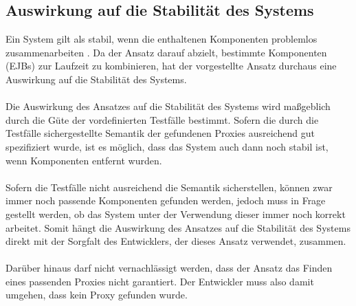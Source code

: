 \subsection{Auswirkung auf die Stabilität des Systems}\label{sec_stabliliy}
Ein System gilt als stabil, wenn die enthaltenen Komponenten problemlos zusammenarbeiten \cite{}. Da der Ansatz darauf abzielt, bestimmte Komponenten (EJBs) zur Laufzeit zu kombinieren, hat der vorgestellte Ansatz durchaus eine Auswirkung auf die Stabilität des Systems.
\\\\
Die Auswirkung des Ansatzes auf die Stabilität des Systems wird maßgeblich durch die Güte der vordefinierten Testfälle bestimmt. Sofern die durch die Testfälle sichergestellte Semantik der gefundenen Proxies ausreichend gut spezifiziert wurde, ist es möglich, dass das System auch dann noch stabil ist, wenn Komponenten entfernt wurden.
\\\\
Sofern die Testfälle nicht ausreichend die Semantik sicherstellen, können zwar immer noch passende Komponenten gefunden werden, jedoch muss in Frage gestellt werden, ob das System unter der Verwendung dieser immer noch korrekt arbeitet. Somit hängt die Auswirkung des Ansatzes auf die Stabilität des Systems direkt mit der Sorgfalt des Entwicklers, der dieses Ansatz verwendet, zusammen.
\\\\
Darüber hinaus darf nicht vernachlässigt werden, dass der Ansatz das Finden eines passenden Proxies nicht garantiert. Der Entwickler muss also damit umgehen, dass kein Proxy gefunden wurde.
